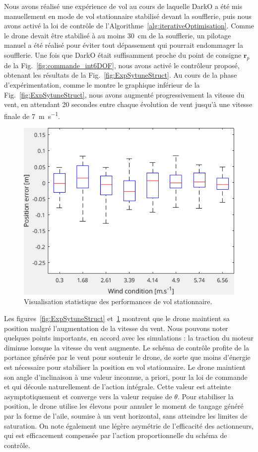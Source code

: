Nous avons réalisé une expérience de vol au cours de laquelle DarkO a été mis manuellement en mode de vol stationnaire stabilisé devant la soufflerie, puis nous avons activé la loi de contrôle de l'Algorithme~\ref{alg:iterativeOptimisation}. Comme le drone devait être stabilisé à au moins \SI{30}{\centi\meter} de la soufflerie, un pilotage manuel a été réalisé pour éviter tout dépassement qui pourrait endommager la soufflerie. Une fois que DarkO était suffisamment proche du point de consigne $\boldsymbol{r}_{p}$ de la Fig.~\ref{fig:commande_int6DOF}, nous avons activé le contrôleur proposé, obtenant les résultats de la Fig.~\ref{fig:ExpSytuneStruct}. Au cours de la phase d'expérimentation, comme le montre le graphique inférieur de la Fig.~\ref{fig:ExpSytuneStruct}, nous avons augmenté progressivement la vitesse du vent, en attendant 20 secondes entre chaque évolution de vent jusqu'à une vitesse finale de \SI{7}{\meter\per\second}.


\begin{figure}[ht!]
    \centering
    \includegraphics[trim=0cm 0cm 0cm 0cm,clip,width=0.6\columnwidth]{figures/boxplot.png}
    \caption{Visualisation statistique des performances de vol stationnaire.}
    \label{fig:statpos}
\end{figure}

Les figures~\ref{fig:ExpSytuneStruct} et~\ref{fig:statpos} montrent que le drone maintient sa position malgré l'augmentation de la vitesse du vent. Nous pouvons noter quelques points importants, en accord avec les simulations : la traction du moteur diminue lorsque la vitesse du vent augmente. Le schéma de contrôle profite de la portance générée par le vent pour soutenir le drone, de sorte que moins d'énergie est nécessaire pour stabiliser la position en vol stationnaire. Le drone maintient son angle d'inclinaison à une valeur inconnue, a priori, pour la loi de commande et qui découle naturellement de l'action intégrale. Cette valeur est atteinte asymptotiquement et converge vers la valeur requise de $\theta$. Pour stabiliser la position, le drone utilise les élevons pour annuler le moment de tangage généré par la forme de l'aile, soumise à un vent horizontal, sans atteindre les limites de saturation.
On note également une légère asymétrie de l'efficacité des actionneurs, qui est efficacement compensée par l'action proportionnelle du schéma de contrôle.


